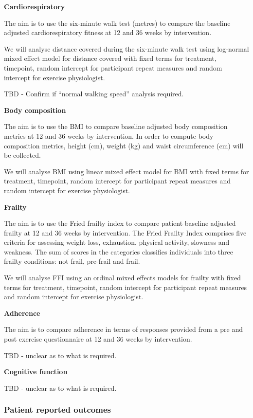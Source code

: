 \documentclass[
]{article}
\begin{document}
\textbf{Cardiorespiratory}

The aim is to use the six-minute walk test (metres) to compare the baseline adjusted cardiorespiratory fitness at 12 and 36 weeks by intervention.

We will analyse distance covered during the six-minute walk test using log-normal mixed effect model for distance covered with fixed terms for treatment, timepoint, random intercept for participant repeat measures and random intercept for exercise physiologist.

TBD - Confirm if ``normal walking speed'' analysis required.

\textbf{Body composition}

The aim is to use the BMI to compare baseline adjusted body composition metrics at 12 and 36 weeks by intervention.
In order to compute body composition metrics, height (cm), weight (kg) and waist circumference (cm) will be collected.

We will analyse BMI using linear mixed effect model for BMI with fixed terms for treatment, timepoint, random intercept for participant repeat measures and random intercept for exercise physiologist.

\textbf{Frailty}

The aim is to use the Fried frailty index to compare patient baseline adjusted frailty at 12 and 36 weeks by intervention.
The Fried Frailty Index comprises five criteria for assessing weight loss, exhaustion, physical activity, slowness and weakness.
The sum of scores in the categories classifies individuals into three frailty conditions: not frail, pre-frail and frail.

We will analyse FFI using an ordinal mixed effects models for frailty with fixed terms for treatment, timepoint, random intercept for participant repeat measures and random intercept for exercise physiologist.

\textbf{Adherence}

The aim is to compare adherence in terms of responses provided from a pre and post exercise questionnaire at 12 and 36 weeks by intervention.

TBD - unclear as to what is required.

\textbf{Cognitive function}

TBD - unclear as to what is required.



\hypertarget{patient-reported-outcomes}{%
\subsubsection{Patient reported outcomes}\label{patient-reported-outcomes}}
\end{document}
